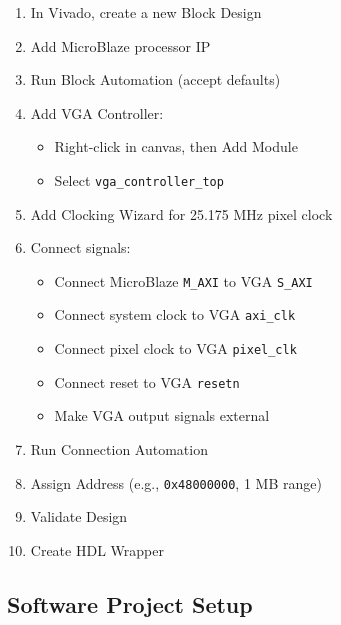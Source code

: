 \documentclass[11pt,letterpaper]{report}
\begin{document}
\begin{enumerate}
    \item In Vivado, create a new Block Design
    \item Add MicroBlaze processor IP
    \item Run Block Automation (accept defaults)
    \item Add VGA Controller:
    \begin{itemize}
        \item Right-click in canvas, then Add Module
        \item Select \texttt{vga\_controller\_top}
    \end{itemize}
    \item Add Clocking Wizard for 25.175 MHz pixel clock
    \item Connect signals:
    \begin{itemize}
        \item Connect MicroBlaze \texttt{M\_AXI} to VGA \texttt{S\_AXI}
        \item Connect system clock to VGA \texttt{axi\_clk}
        \item Connect pixel clock to VGA \texttt{pixel\_clk}
        \item Connect reset to VGA \texttt{resetn}
        \item Make VGA output signals external
    \end{itemize}
    \item Run Connection Automation
    \item Assign Address (e.g., \texttt{0x48000000}, 1 MB range)
    \item Validate Design
    \item Create HDL Wrapper
\end{enumerate}

\subsection{Software Project Setup}
\end{document}
